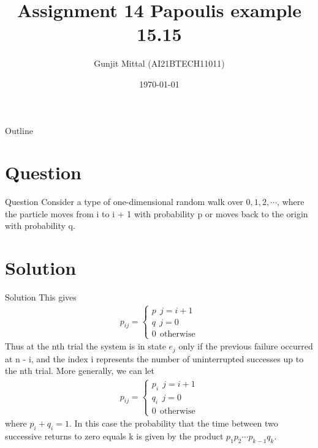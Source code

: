 \documentclass{beamer}
\title{Assignment 14 Papoulis example 15.15}
\author{Gunjit Mittal (AI21BTECH11011)}
\date{\today}
\theoremstyle{remark}
\numberwithin{equation}{section}
\numberwithin{figure}{section}
\numberwithin{table}{section}
\begin{document}
 
\begin{frame}
  \titlepage{}
\end{frame} 
\logo{}
\begin{frame}{Outline} 
  \tableofcontents
\end{frame}
\section{Question} 
\begin{frame}{Question}
  Consider a type of one-dimensional random walk over $0,1,2,\cdots$, where the particle
  moves from i to i + 1 with probability p or moves back to the origin with probability q. 
\end{frame}
\section{Solution} 
\begin{frame}{Solution} 
    This gives
    \begin{align}
        p_{ij} = \begin{cases}
            p ~~ j=i+1\\
            q ~~ j=0\\
            0 ~~ \text{otherwise}
        \end{cases}
    \end{align}
    Thus at the nth trial the system is in state $e_j$ only if the previous failure occurred at n - i,
    and the index i represents the number of uninterrupted successes up to the nth trial. More
    generally, we can let
    \begin{align}
  p_{ij} = \begin{cases}
    p_i ~~ j=i+1\\
    q_i ~~ j=0\\
    0 ~~ \text{otherwise}
\end{cases}
\end{align}
    where $p_i + q_i = 1$. In this case the probability that the time between two successive
    returns to zero equals k is given by the product $p_1p_2\cdots p_{k-1}q_k$. 
 \end{frame}
\end{document}
